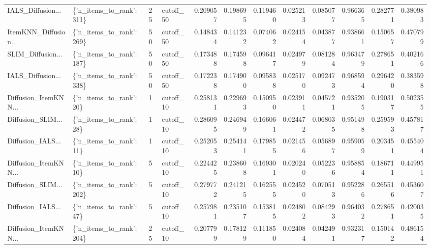 \begin{tabular}{llllrrrrrrrr}
IALS\_Diffusion... & \{'n\_items\_to\_rank': 311\} &       25 & cutoff\_50 & 0.209057 &   0.198695 & 0.119460 & 0.025213 &        0.085077 &                   0.966365 &       0.282771 &            0.380983 \\
ItemKNN\_Diffusion... & \{'n\_items\_to\_rank': 269\} &       50 & cutoff\_50 & 0.148434 &   0.141232 & 0.074062 & 0.024154 &        0.043877 &                   0.938661 &       0.150657 &            0.470799 \\
SLIM\_Diffusion... & \{'n\_items\_to\_rank': 187\} &       50 & cutoff\_50 & 0.173488 &   0.174598 & 0.096417 & 0.024979 &        0.081284 &                   0.963479 &       0.278651 &            0.402166 \\
IALS\_Diffusion... & \{'n\_items\_to\_rank': 338\} &       50 & cutoff\_50 & 0.172238 &   0.174900 & 0.095838 & 0.025170 &        0.092473 &                   0.968594 &       0.296420 &            0.383598 \\
Diffusion\_ItemKNN... &  \{'n\_items\_to\_rank': 20\} &        1 & cutoff\_10 & 0.258131 &   0.229693 & 0.150950 & 0.023911 &        0.045721 &                   0.935205 &       0.190317 &            0.502355 \\
Diffusion\_SLIM... &  \{'n\_items\_to\_rank': 28\} &        1 & cutoff\_10 & 0.286095 &   0.246949 & 0.166061 & 0.024472 &        0.068035 &                   0.951498 &       0.259593 &            0.457817 \\
Diffusion\_IALS... &  \{'n\_items\_to\_rank': 11\} &        1 & cutoff\_10 & 0.252053 &   0.254141 & 0.179855 & 0.021456 &        0.056897 &                   0.959059 &       0.203451 &            0.455404 \\
Diffusion\_ItemKNN... &  \{'n\_items\_to\_rank': 10\} &        5 & cutoff\_10 & 0.224425 &   0.238608 & 0.169301 & 0.020240 &        0.052236 &                   0.958854 &       0.186711 &            0.449951 \\
Diffusion\_SLIM... & \{'n\_items\_to\_rank': 202\} &        5 & cutoff\_10 & 0.279772 &   0.241215 & 0.162555 & 0.024520 &        0.070513 &                   0.952286 &       0.265516 &            0.453607 \\
Diffusion\_IALS... &  \{'n\_items\_to\_rank': 47\} &        5 & cutoff\_10 & 0.257981 &   0.235107 & 0.153815 & 0.024802 &        0.084293 &                   0.964032 &       0.278651 &            0.420035 \\
Diffusion\_ItemKNN... & \{'n\_items\_to\_rank': 204\} &       25 & cutoff\_10 & 0.207799 &   0.178129 & 0.111850 & 0.024084 &        0.042491 &                   0.932317 &       0.150142 &            0.486154 \\

\end{tabular}
